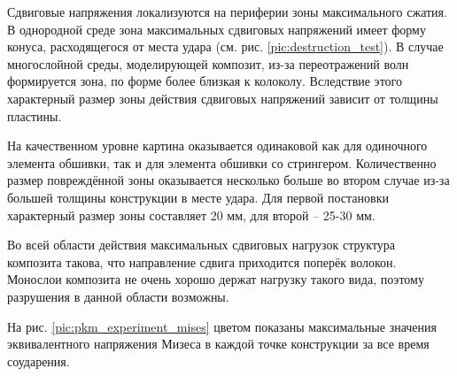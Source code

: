 Сдвиговые напряжения локализуются на периферии зоны максимального сжатия. В однородной среде зона максимальных сдвиговых напряжений имеет форму конуса, расходящегося от места удара (см. рис. \ref{pic:destruction_test}). В случае многослойной среды, моделирующей композит, из-за переотражений волн формируется зона, по форме более близкая к колоколу. Вследствие этого характерный размер зоны действия сдвиговых напряжений зависит от толщины пластины.

На качественном уровне картина оказывается одинаковой как для одиночного элемента обшивки, так и для элемента обшивки со стрингером. Количественно размер повреждённой зоны оказывается несколько больше во втором случае из-за большей толщины конструкции в месте удара. Для первой постановки характерный размер зоны составляет 20 мм, для второй -- 25-30 мм.

Во всей области действия максимальных сдвиговых нагрузок структура композита такова, что направление сдвига приходится поперёк волокон. Монослои композита не очень хорошо держат нагрузку такого вида, поэтому разрушения в данной области возможны.




На рис. \ref{pic:pkm_experiment_mises} цветом показаны максимальные значения эквивалентного напряжения Мизеса в каждой точке конструкции за все время соударения.

